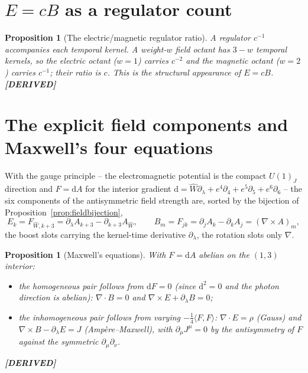 \documentclass[11pt,oneside]{book}
\newcommand{\Wh}{\hat{W}}                         %
\newcommand{\dd}{\mathrm{d}}
\newcommand{\status}[1]{{\sffamily\bfseries\color{statuscol}[#1]}}
\theoremstyle{plain}
\newtheorem{proposition}[theorem]{Proposition}
\theoremstyle{definition}
\theoremstyle{remark}
\begin{document}
\section{$E=cB$ as a regulator count}
\label{sec:EcB}

\begin{proposition}[The electric/magnetic regulator ratio]
\label{prop:EcB}
A regulator $c^{-1}$ accompanies each temporal kernel. A weight-$w$ field octant has
$3-w$ temporal kernels, so the electric octant ($w=1$) carries $c^{-2}$ and the
magnetic octant ($w=2$) carries $c^{-1}$; their ratio is $c$. This is the structural
appearance of $E=cB$. \status{DERIVED}
\end{proposition}

\section{The explicit field components and Maxwell's four equations}
\label{sec:maxwell-explicit}

With the gauge principle -- the electromagnetic potential is the compact $U(1)_J$
direction and $F=\dd A$ for the interior gradient $\dd=\Wh\partial_\lambda
+e^4\partial_4+e^5\partial_5+e^6\partial_6$ -- the six components of the
antisymmetric field strength are, sorted by the bijection of
Proposition~\ref{prop:fieldbijection},
\[
  E_k=F_{\Wh,k+3}=\partial_\lambda A_{k+3}-\partial_{k+3}A_{\Wh},
  \qquad
  B_m=F_{jk}=\partial_jA_k-\partial_kA_j=(\nabla\times A)_m,
\]
the boost slots carrying the kernel-time derivative $\partial_\lambda$, the rotation
slots only $\nabla$.

\begin{proposition}[Maxwell's equations]
\label{prop:maxwell}
With $F=\dd A$ abelian on the $(1,3)$ interior:
\begin{itemize}[itemsep=1pt]
\item the homogeneous pair follows from $\dd F=0$ (since $\dd^2=0$ and the photon
direction is abelian): $\nabla\!\cdot\!B=0$ and $\nabla\times E+\partial_\lambda B=0$;
\item the inhomogeneous pair follows from varying $-\tfrac14\langle F,F\rangle$:
$\nabla\!\cdot\!E=\rho$ (Gauss) and $\nabla\times B-\partial_\lambda E=J$
(Amp\`ere--Maxwell), with $\partial_\mu J^\mu=0$ by the antisymmetry of $F$ against
the symmetric $\partial_\mu\partial_\nu$.
\end{itemize}
\status{DERIVED}
\end{proposition}
\end{document}

